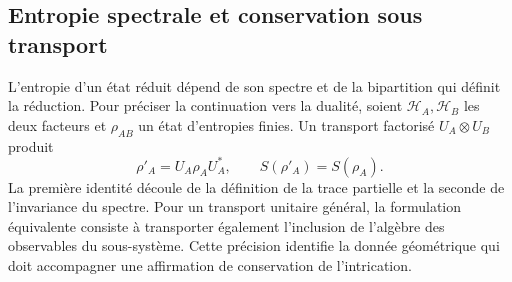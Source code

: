 \subsection{Entropie spectrale et conservation sous transport}
\label{v:ant:sec:biparticion-transporte}

L’entropie d’un état réduit dépend de son spectre et de la
bipartition qui définit la réduction. Pour préciser la continuation
vers la dualité, soient \(\mathcal H_A,\mathcal H_B\) les deux facteurs
et \(\rho_{AB}\) un état d’entropies finies. Un transport
factorisé \(U_A\otimes U_B\) produit
\[
 \rho'_A=U_A\rho_AU_A^*,\qquad S(\rho'_A)=S(\rho_A).
\]
La première identité découle de la définition de la trace partielle et la
seconde de l’invariance du spectre. Pour un transport unitaire
général, la formulation équivalente consiste à transporter également
l’inclusion de l’algèbre des observables du sous-système. Cette précision
identifie la donnée géométrique qui doit accompagner une affirmation
de conservation de l’intrication.
